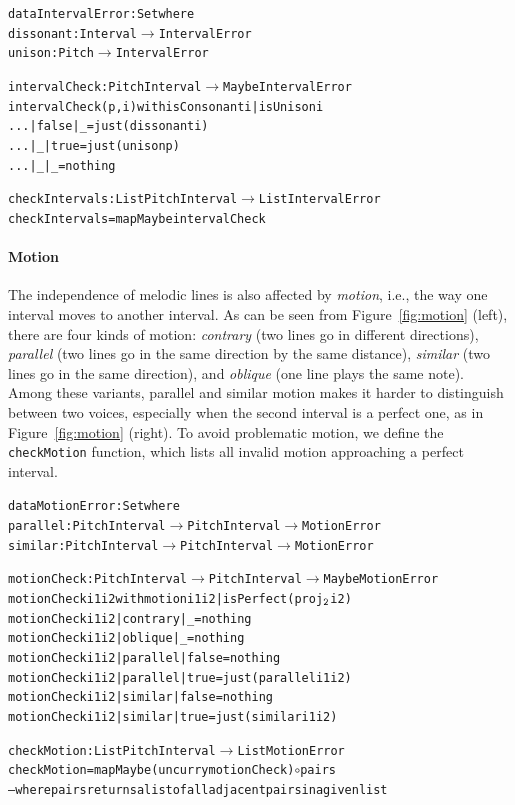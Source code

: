 \begin{alltt}
data IntervalError : Set where
  dissonant : Interval \(\rightarrow\) IntervalError
  unison    : Pitch \(\rightarrow\) IntervalError

intervalCheck : PitchInterval \(\rightarrow\) Maybe IntervalError
intervalCheck (p , i) with isConsonant i | isUnison i
... | false | _    = just (dissonant i)
... | _     | true = just (unison p)
... | _     | _    = nothing

checkIntervals : List PitchInterval \(\rightarrow\) List IntervalError
checkIntervals = mapMaybe intervalCheck
\end{alltt}

\paragraph{Motion}

\Motion

The independence of melodic lines is also affected by \emph{motion},
i.e., the way one interval moves to another interval.
As can be seen from Figure~\ref{fig:motion} (left), there are four
kinds of motion: \emph{contrary} (two lines go in different directions),
\emph{parallel} (two lines go in the same direction by the same
distance), \emph{similar} (two lines go in the same direction),
and \emph{oblique} (one line plays the same note).
Among these variants, parallel and similar motion makes it harder
to distinguish between two voices, especially when the second
interval is a perfect one, as in Figure~\ref{fig:motion} (right).
To avoid problematic motion, we define the \texttt{checkMotion}
function, which lists all invalid motion approaching a perfect interval.

\begin{alltt}
data MotionError : Set where
  parallel : PitchInterval \(\rightarrow\) PitchInterval \(\rightarrow\) MotionError
  similar  : PitchInterval \(\rightarrow\) PitchInterval \(\rightarrow\) MotionError

motionCheck : PitchInterval \(\rightarrow\) PitchInterval \(\rightarrow\) Maybe MotionError
motionCheck i1 i2 with motion i1 i2 | isPerfect (proj\(\sb{\mathtt{2}}\) i2)
motionCheck i1 i2 | contrary | \_     = nothing
motionCheck i1 i2 | oblique  | \_     = nothing
motionCheck i1 i2 | parallel | false = nothing
motionCheck i1 i2 | parallel | true  = just (parallel i1 i2)
motionCheck i1 i2 | similar  | false = nothing
motionCheck i1 i2 | similar  | true  = just (similar i1 i2)

checkMotion : List PitchInterval \(\rightarrow\) List MotionError
checkMotion = mapMaybe (uncurry motionCheck) \(\circ\) pairs
-- where pairs returns a list of all adjacent pairs in a given list
\end{alltt}

